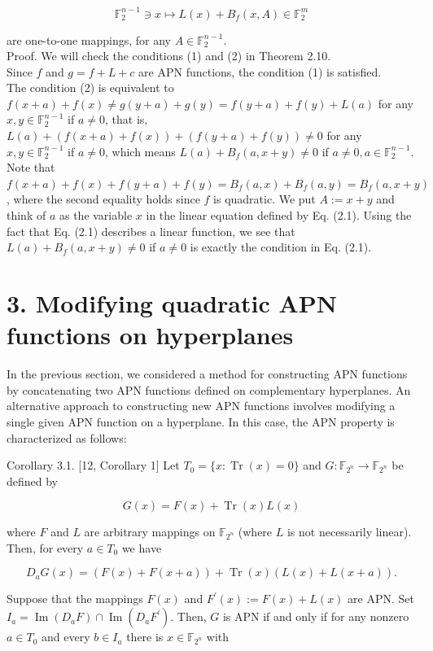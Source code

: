 \documentclass[10pt]{article}
\begin{document}
\begin{equation*}
\mathbb{F}_{2}^{n-1} \ni x \mapsto L(x)+B_{f}(x, A) \in \mathbb{F}_{2}^{m} \tag{2.1}
\end{equation*}


are one-to-one mappings, for any $A \in \mathbb{F}_{2}^{n-1}$.\\
Proof. We will check the conditions (1) and (2) in Theorem 2.10.\\
Since $f$ and $g=f+L+c$ are APN functions, the condition (1) is satisfied.\\
The condition (2) is equivalent to $f(x+a)+f(x) \neq g(y+a)+g(y)=f(y+a)+ f(y)+L(a)$ for any $x, y \in \mathbb{F}_{2}^{n-1}$ if $a \neq 0$, that is, $L(a)+(f(x+a)+f(x))+(f(y+ a)+f(y)) \neq 0$ for any $x, y \in \mathbb{F}_{2}^{n-1}$ if $a \neq 0$, which means $L(a)+B_{f}(a, x+y) \neq 0$ if $a \neq 0, a \in \mathbb{F}_{2}^{n-1}$. Note that $f(x+a)+f(x)+f(y+a)+f(y)=B_{f}(a, x)+B_{f}(a, y)= B_{f}(a, x+y)$, where the second equality holds since $f$ is quadratic. We put $A:=x+y$ and think of $a$ as the variable $x$ in the linear equation defined by Eq. (2.1). Using the fact that Eq. (2.1) describes a linear function, we see that $L(a)+B_{f}(a, x+y) \neq 0$ if $a \neq 0$ is exactly the condition in Eq. (2.1).

\section*{3. Modifying quadratic APN functions on hyperplanes}
In the previous section, we considered a method for constructing APN functions by concatenating two APN functions defined on complementary hyperplanes. An alternative approach to constructing new APN functions involves modifying a single given APN function on a hyperplane. In this case, the APN property is characterized as follows:

Corollary 3.1. [12, Corollary 1] Let $T_{0}=\{x: \operatorname{Tr}(x)=0\}$ and $G: \mathbb{F}_{2^{n}} \rightarrow \mathbb{F}_{2^{n}}$ be defined by

$$
G(x)=F(x)+\operatorname{Tr}(x) L(x)
$$

where $F$ and $L$ are arbitrary mappings on $\mathbb{F}_{2^{n}}$ (where $L$ is not necessarily linear). Then, for every $a \in T_{0}$ we have

$$
D_{a} G(x)=(F(x)+F(x+a))+\operatorname{Tr}(x)(L(x)+L(x+a)) .
$$

Suppose that the mappings $F(x)$ and $F^{\prime}(x):=F(x)+L(x)$ are APN. Set $I_{a}= \operatorname{Im}\left(D_{a} F\right) \cap \operatorname{Im}\left(D_{a} F^{\prime}\right)$. Then, $G$ is APN if and only if for any nonzero $a \in T_{0}$ and every $b \in I_{a}$ there is $x \in \mathbb{F}_{2^{n}}$ with
\end{document}
